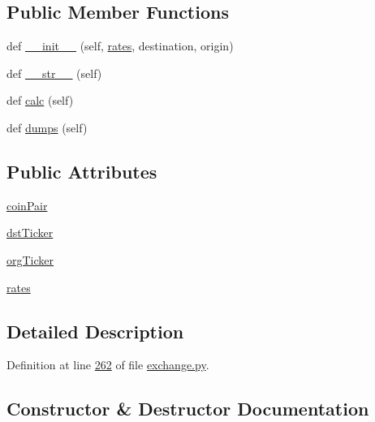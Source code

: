 \subsection*{Public Member Functions}
\begin{DoxyCompactItemize}
\item 
def \hyperlink{classexchange_1_1_differences_a4a3bc979ffeac30f0d767d08a9a1b518}{\+\_\+\+\_\+init\+\_\+\+\_\+} (self, \hyperlink{classexchange_1_1_differences_a821ecbc04dae3081f634a28d377c69c3}{rates}, destination, origin)
\item 
def \hyperlink{classexchange_1_1_differences_af7c7e7d5c268a1229f78f0ee911cbbe9}{\+\_\+\+\_\+str\+\_\+\+\_\+} (self)
\item 
def \hyperlink{classexchange_1_1_differences_abf44b47cfb95a1f4eadfb99f4f8f5468}{calc} (self)
\item 
def \hyperlink{classexchange_1_1_differences_adf6009f54dd9051816afd1d0713b9e90}{dumps} (self)
\end{DoxyCompactItemize}
\subsection*{Public Attributes}
\begin{DoxyCompactItemize}
\item 
\hyperlink{classexchange_1_1_differences_a88e6a458df95b4ff6896dd8231d28c8d}{coin\+Pair}
\item 
\hyperlink{classexchange_1_1_differences_a80b6dd387553597287b07b64553c7ebd}{dst\+Ticker}
\item 
\hyperlink{classexchange_1_1_differences_a25b2d5907724e4647425ab4089ce065e}{org\+Ticker}
\item 
\hyperlink{classexchange_1_1_differences_a821ecbc04dae3081f634a28d377c69c3}{rates}
\end{DoxyCompactItemize}


\subsection{Detailed Description}


Definition at line \hyperlink{exchange_8py_source_l00262}{262} of file \hyperlink{exchange_8py_source}{exchange.\+py}.



\subsection{Constructor \& Destructor Documentation}
\mbox{\label{classexchange_1_1_differences_a4a3bc979ffeac30f0d767d08a9a1b518}} 
